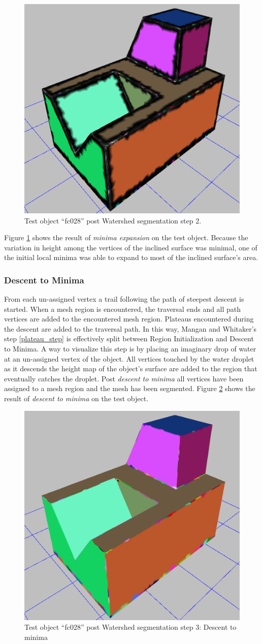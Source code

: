 \begin{figure}[htb]
	\centering
	\includegraphics[width=0.5\linewidth]{../resources/watershed/fc028_WS2.png}
\caption{
Test object ``fc028'' post Watershed segmentation step 2.
}
	\label{fig:ws_2}
\end{figure}

Figure \ref{fig:ws_2} shows the result of \textit{minima expansion} on the test object.
Because the variation in height among the vertices of the inclined surface was minimal, one of the initial local minima was able to expand to most of the inclined surface's area.

\subsubsection{Descent to Minima}
From each un-assigned vertex a trail following the path of steepest descent is started.
When a mesh region is encountered, the traversal ends and all path vertices are added to the encountered mesh region.
Plateaus encountered during the descent are added to the traversal path.
In this way, Mangan and Whitaker's step \ref{plateau_step} is effectively split between Region Initialization and Descent to Minima.
A way to visualize this step is by placing an imaginary drop of water at an un-assigned vertex of the object.
All vertices touched by the water droplet as it descends the height map of the object's surface are added to the region that eventually catches the droplet.
Post \textit{descent to minima} all vertices have been assigned to a mesh region and the mesh has been segmented.
Figure \ref{fig:ws_3} shows the result of \textit{descent to minima} on the test object.

\begin{figure}[htb]
	\centering
	\includegraphics[width=0.5\linewidth]{../resources/watershed/fc028_WS3.png}
\caption{
Test object ``fc028'' post Watershed segmentation step 3: Descent to minima
}
	\label{fig:ws_3}
\end{figure}

